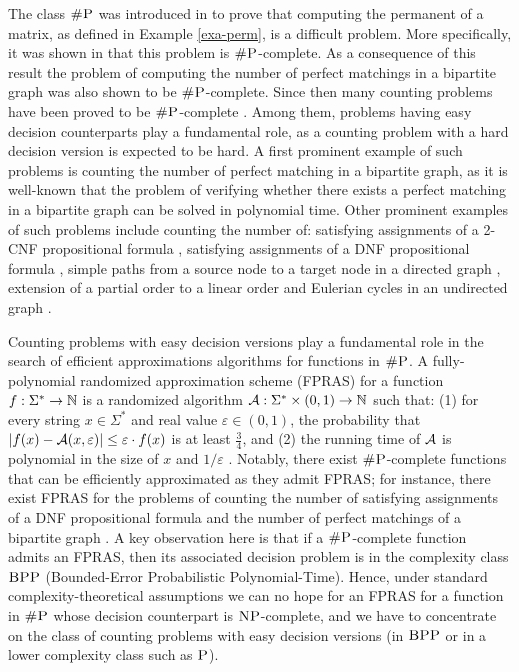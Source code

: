 
The class $\text{\sc \#P}$ was introduced in \cite{Valiant79} to prove that computing the permanent of a matrix, as defined in Example \ref{exa-perm}, is a difficult problem. More specifically, it was shown in  \cite{Valiant79}  that this problem is $\text{\sc \#P}$-complete. As a consequence of this result the problem of computing the number of perfect matchings in a bipartite graph was also shown to be $\text{\sc \#P}$-complete. Since then  many counting problems have been proved to be $\text{\sc \#P}$-complete \cite{V79b,PB83,P86,L86,BW91,HMRS98,BW05,DS12, PS13,PS14}. Among them, problems having easy decision counterparts play a fundamental role, as a counting problem with a hard decision version is expected to be hard. A first prominent example of such problems is counting the number of perfect matching in a bipartite graph, as it is well-known that the problem of verifying whether there exists a perfect matching in a bipartite graph can be solved in polynomial time. Other prominent examples of such problems include counting the number of: satisfying assignments of a 2-CNF propositional formula \cite{V79b}, satisfying assignments of a DNF propositional formula \cite{DHK05}, simple paths from a source node to a target node in a directed graph \cite{V79b}, extension of a partial order to a linear order \cite{BW91} and Eulerian cycles in an undirected graph \cite{BW05}. 

Counting problems with easy decision versions play a fundamental role in the search of efficient approximations algorithms for functions in $\text{\sc \#P}$. A fully-polynomial randomized approximation scheme (FPRAS) for a function $f : \Sigma^* \to \mathbb{N}$ is a randomized algorithm ${\cal A} : \Sigma^* \times (0,1) \to \bbN$ such that: (1) for every string $x \in \Sigma^*$ and real value $\varepsilon \in (0,1)$, the probability that $|f(x) - {\cal A}(x,\varepsilon)| \leq \varepsilon \cdot f(x)$ is at least $\frac{3}{4}$, and (2) the running time of ${\cal A}$ is polynomial in the size of $x$ and $1/\varepsilon$ \cite{KL83}. Notably, there exist $\text{\sc \#P}$-complete functions that can be efficiently approximated as they admit FPRAS; for instance, there exist FPRAS for the problems of counting the number of satisfying assignments of a DNF propositional formula \cite{KL83} and the number of perfect matchings of a bipartite graph \cite{JSV04}. A key observation here is that if a $\text{\sc \#P}$-complete function admits an FPRAS, then its associated decision problem is in the complexity class $\text{\sc BPP}$ (Bounded-Error Probabilistic Polynomial-Time). Hence, under standard complexity-theoretical assumptions we can no hope for an FPRAS for a function in $\text{\sc \#P}$ whose decision counterpart is $\text{\sc NP}$-complete, and we have to concentrate on the class of counting problems with easy decision versions (in $\text{\sc BPP}$ or in a lower complexity class such as $\text{\sc P}$). 

